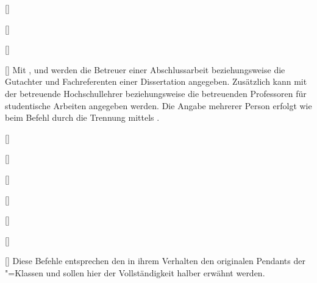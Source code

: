 \begin{Declaration*}{}
\begin{Declaration*}{}
\begin{Declaration*}{}
\begin{Declaration}{[]}
\begin{Declaration}{[]}
\begin{Declaration}{[]}
\begin{Declaration}{[]}
\printdeclarationlist%
%
%
%
%
Mit ,  und  werden die Betreuer 
einer Abschlussarbeit beziehungsweise die Gutachter und Fachreferenten einer 
Dissertation angegeben. Zusätzlich kann mit  der betreuende 
Hochschullehrer beziehungsweise die betreuenden Professoren für studentische 
Arbeiten angegeben werden. Die Angabe mehrerer Person erfolgt wie beim Befehl 
 durch die Trennung mittels .
%
\end{Declaration}
\end{Declaration}
\end{Declaration}
\end{Declaration}

\begin{Bundle}{}
\begin{Declaration}{[]}
\begin{Declaration}{[]}
\begin{Declaration}{[]}
\begin{Declaration}{[]}
\begin{Declaration}{[]}
\begin{Declaration}{[]}
\begin{Declaration}{[]}
\printdeclarationlist%
%
Diese Befehle entsprechen den in ihrem Verhalten den originalen Pendants der 
\KOMAScript"=Klassen und sollen hier der Vollständigkeit halber erwähnt werden.


\end{Declaration}
\end{Declaration}
\end{Declaration}
\end{Declaration}
\end{Declaration}
\end{Declaration}
\end{Declaration}
\end{Bundle}
\end{Declaration*}
\end{Declaration*}
\end{Declaration*}
